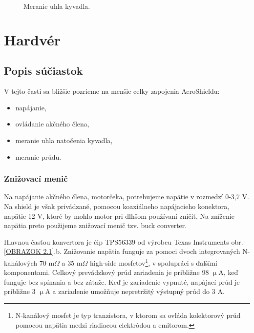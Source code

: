 \begin{figure}[!tbh]
	\hfill
	\hfill
	\hfill
	\caption{Meranie uhla kyvadla.}\label{OBRAZOK 2.1.2}
\end{figure}


\newpage
\section{Hardvér}
\subsection{Popis súčiastok}

V tejto časti sa bližšie pozrieme na menšie celky zapojenia AeroShieldu:
\begin{multicols}{2}
	\begin{itemize}
		\item napájanie,
		\item ovládanie akčného člena,
		\item meranie uhla natočenia kyvadla,
		\item meranie prúdu.
	\end{itemize}
\end{multicols}


\subsubsection{Znižovací menič}
\label{nap}

Na napájanie akčného člena, motorčeka, potrebujeme napätie v rozmedzí 0-3,7 V. Na shield je však privádzané, pomocou koaxiálneho napájacieho konektora, napätie 12 V, ktoré by mohlo motor pri dlhšom používaní zničiť. Na zníženie napätia preto použijeme znižovací menič tzv. buck converter. 

Hlavnou časťou konvertora je čip TPS56339 od výrobcu Texas Instruments obr.\ref{OBRAZOK 2.1}.b. Znižovanie napätia funguje za pomoci dvoch integrovaných N-kanálových 70 m$\Omega$ a 35 m$\Omega$ high-side mosfetov\footnote[4]{N-kanálový mosfet je typ tranzistora, v ktorom sa ovláda kolektorový prúd pomocou napätia medzi riadiacou elektródou a emitorom.}, v spolupráci s ďalšími komponentami. Celkový prevádzkový prúd zariadenia je približne 98 $\upmu$A, keď funguje bez spínania a bez záťaže. Keď je zariadenie vypnuté, napájací prúd je približne 3 $\upmu$A a zariadenie umožňuje nepretržitý výstupný prúd do 3 A\cite{buckobr}.

